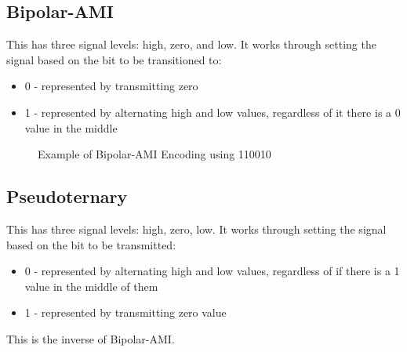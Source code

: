 \subsection{Bipolar-AMI}
This has three signal levels: high, zero, and low. It works through setting the signal based on the bit to be transitioned to:
\begin{itemize}
    \item 0 - represented by transmitting zero
    \item 1 - represented by alternating high and low values, regardless of it there is a 0 value in the middle
\end{itemize}
\begin{figure}[H]
\centering
{}
\caption{Example of Bipolar-AMI Encoding using 110010}
\end{figure}


\subsection{Pseudoternary}
This has three signal levels: high, zero, low. It works through setting the signal based on the bit to be transmitted:
\begin{itemize}
    \item 0 - represented by alternating high and low values, regardless of if there is a 1 value in the middle of them
    \item 1 - represented by transmitting zero value
\end{itemize}

This is the inverse of Bipolar-AMI.

